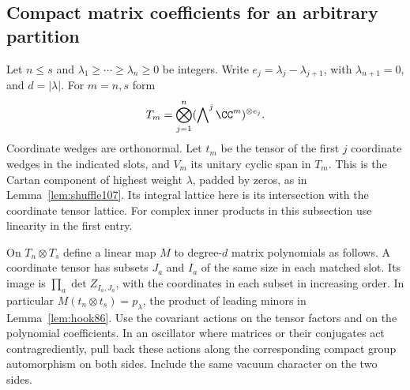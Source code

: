 \documentclass[a4paper,11pt]{article}
\theoremstyle{definition}
\theoremstyle{remark}
\numberwithin{equation}{section}
\begin{document}
\subsection{Compact matrix coefficients for an arbitrary partition}\label{nav:V-31}
Let \(n\le s\) and \(\lambda_1\ge\cdots\ge\lambda_n\ge0\)
be integers. Write \(e_j=\lambda_j-\lambda_{j+1}\), with
\(\lambda_{n+1}=0\), and \(d=|\lambda|\). For \(m=n,s\) form
\[
 T_m=\bigotimes_{j=1}^n(\bigwedge\nolimits^j\CC^m)^{\otimes e_j}.
\]
Coordinate wedges are orthonormal. Let \(t_m\) be the tensor of
the first \(j\) coordinate wedges in the indicated slots, and
\(V_m\) its unitary cyclic span in \(T_m\). This is the Cartan
component of highest weight \(\lambda\), padded by zeros, as in
Lemma~\ref{lem:shuffle107}. Its integral lattice here is
its intersection with the coordinate tensor lattice. For complex
inner products in this subsection use linearity in the first entry.

On \(T_n\otimes T_s\) define a linear map \(M\) to degree-\(d\)
matrix polynomials as follows. A coordinate tensor has subsets
\(J_a\) and \(I_a\) of the same size in each matched slot. Its
image is \(\prod_a\det Z_{I_a,J_a}\), with the coordinates in
each subset in increasing order. In particular \(M(t_n\otimes t_s)
=p_\lambda\), the product of leading minors in
Lemma~\ref{lem:hook86}. Use the covariant actions on the tensor
factors and on the polynomial coefficients. In an oscillator
where matrices or their conjugates act contragrediently, pull back
these actions along the corresponding compact group automorphism
on both sides. Include the same vacuum character on the two sides.
\end{document}
